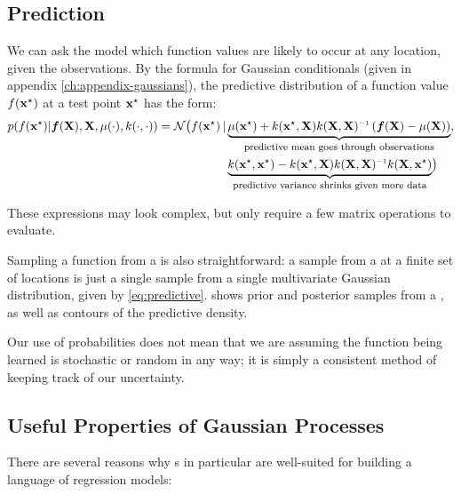 \subsection{Prediction}
We can ask the model which function values are likely to occur at any location, given the observations.
By the formula for Gaussian conditionals (given in appendix \ref{ch:appendix-gaussians}), the predictive distribution of a function value $f({\bf{x}}^\star)$ at a test point ${{\bf{x}}^\star}$ has the form:
%
\begin{align}
p( f(\testpoint) | \funcval, \vX, \mu(\cdot), k(\cdot, \cdot))
 = \mathcal{N} \big( f(\testpoint) \given & \underwrite{\mu(\testpoint) + k(\testpoint, \vX) k(\vX, \vX)\inv \left( \funcval - \mu(\vX) \right) }{\footnotesize predictive mean goes through observations}, \nonumber \\
 & \underwrite{k(\testpoint, \testpoint) - k(\testpoint, \vX) k(\vX, \vX)\inv k(\vX, \testpoint)}{\footnotesize predictive variance shrinks given more data}
 \big)
\label{eq:predictive}
\end{align}

These expressions may look complex, but only require a few matrix operations to evaluate.

Sampling a function from a \gp{} is also straightforward: a sample from a \gp{} at a finite set of locations is just a single sample from a single multivariate Gaussian distribution, given by \cref{eq:predictive}.
 shows prior and posterior samples from a \gp{}, as well as contours of the predictive density.

Our use of probabilities does not mean that we are assuming the function being learned is stochastic or random in any way; it is simply a consistent method of keeping track of our uncertainty.



\subsection{Useful Properties of Gaussian Processes}
\label{sec:useful-properties}

There are several reasons why \gp{}s in particular are well-suited for building a language of regression models:

